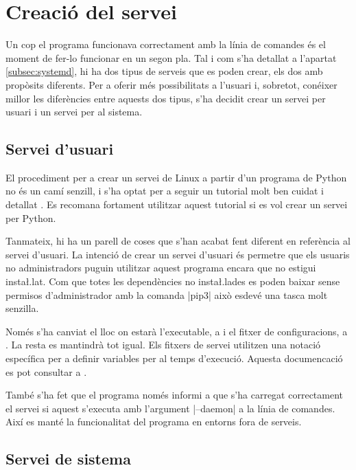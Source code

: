 \section{Creació del servei }

Un cop el programa funcionava correctament amb la línia de comandes és el moment
de fer-lo funcionar en un segon pla. Tal i com s'ha detallat a l'apartat
\ref{subsec:systemd}, hi ha dos tipus de serveis que es poden crear, els dos
amb propòsits diferents. Per a oferir més possibilitats a l'usuari i, sobretot,
conéixer millor les diferències entre aquests dos tipus, s'ha decidit crear
un servei per usuari i un servei per al sistema.

\subsection{Servei d'usuari}

El procediment per a crear un servei de Linux a partir d'un programa de Python
no és un camí senzill, i s'ha optat per a seguir un tutorial molt ben cuidat i
detallat \cite{PythonSystemdTutorial}. Es recomana fortament utilitzar aquest
tutorial si es vol crear un servei per Python.

Tanmateix, hi ha un parell de coses que s'han acabat fent diferent en referència
al servei d'usuari. La intenció de crear un servei d'usuari és permetre que els
usuaris no administradors puguin utilitzar aquest programa encara que no estigui
insta\l.lat. Com que totes les dependències no insta\l.lades es poden baixar
sense permisos d'administrador amb la comanda \ord|pip3| això esdevé una tasca
molt senzilla.

Només s'ha canviat el lloc on estarà l'executable, a  i el
fitxer de configuracions, a . La resta es mantindrà
tot igual. Els fitxers de servei utilitzen una notació específica per a
definir variables per al temps d'execució. Aquesta documencació es pot consultar
a \cite{mansystemd}.

També s'ha fet que el programa només informi a  que s'ha carregat
correctament el servei si aquest s'executa amb l'argument \ord|--daemon| a la
línia de comandes. Així es manté la funcionalitat del programa en entorns fora
de serveis.

\subsection{Servei de sistema}
\label{subsec:systemd_system}

